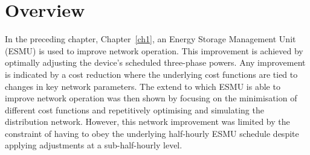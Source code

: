 \section{Overview}
\label{ch2:sec:overview}



In the preceding chapter, Chapter~\ref{ch1}, an Energy Storage Management Unit (ESMU) is used to improve network operation.
This improvement is achieved by optimally adjusting the device's scheduled three-phase powers.
Any improvement is indicated by a cost reduction where the underlying cost functions are tied to changes in key network parameters.
The extend to which ESMU is able to improve network operation was then shown by focusing on the minimisation of different cost functions and repetitively optimising and simulating the distribution network.
However, this network improvement was limited by the constraint of having to obey the underlying half-hourly ESMU schedule despite applying adjustments at a sub-half-hourly level.

